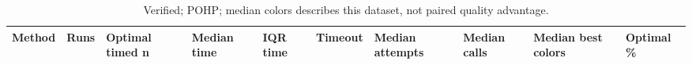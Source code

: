 \begin{table}[htbp]
\centering
\caption{Verified; POHP; median colors describes this dataset, not paired quality advantage.}
\label{tab:p2a-POHP-methods}
\begin{tabular}{llllllllll}
\hline
Method & Runs & Optimal timed n & Median time & IQR time & Timeout & Median attempts & Median calls & Median best colors & Optimal \% \\
\hline
\hline
\end{tabular}
\end{table}
